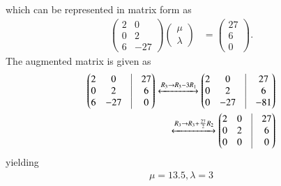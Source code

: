 \documentclass[12pt]{article}
\newcommand{\myvec}[1]{\ensuremath{\begin{pmatrix}#1\end{pmatrix}}}
\begin{document}
which can be represented in matrix form as
\begin{align}
	\myvec{2&0\\0&2\\6&-27}\myvec{\mu\\\lambda}&=\myvec{27\\6\\0}.
\end{align}
The augmented matrix is given as
\begin{align}
	\myvec{2 & 0 & \vrule & 27\\0 & 2 & \vrule & 6\\ 6 & -27 & \vrule & 0}
	\xleftrightarrow{R_{3}\rightarrow R_{3}-3R_{1}}  	
	\myvec{2 & 0 & \vrule & 27\\0 & 2 & \vrule & 6\\ 0 & -27 & \vrule & -81}\\
	\xleftrightarrow{R_{3}\rightarrow R_{3}+\frac{27}{2}R_{2}}  	
	\myvec{2 & 0 & \vrule & 27\\0 & 2 & \vrule & 6\\ 0 & 0 & \vrule & 0}
\end{align}
yielding
\begin{align}
	\mu=13.5,
	\lambda=3
\end{align}
\end{document}
